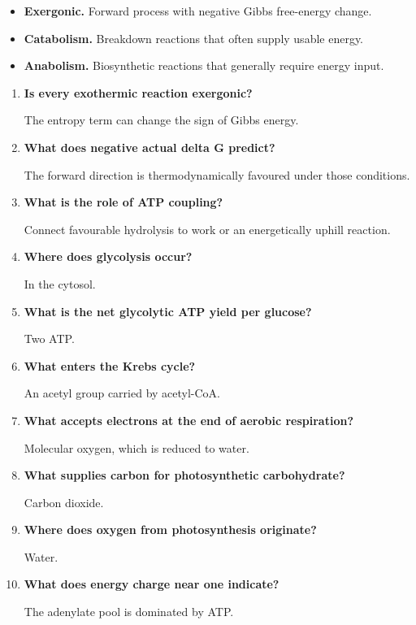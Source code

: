 \documentclass[12pt,a4paper]{article}
\newcommand{\Q}[1]{\textbf{#1}\par\noindent\ignorespaces}
\begin{document}
\begin{tcolorbox}[defbox, title={One-Line Definitions}]
\begin{itemize}[leftmargin=*, itemsep=3pt, topsep=4pt]
  \item \textbf{Exergonic.} Forward process with negative Gibbs free-energy change.
  \item \textbf{Catabolism.} Breakdown reactions that often supply usable energy.
  \item \textbf{Anabolism.} Biosynthetic reactions that generally require energy input.
\end{itemize}
\end{tcolorbox}

\begin{tcolorbox}[exambox, title={Frequently Asked / Viva Questions}]
\begin{enumerate}[topsep=0pt, label=\textbf{Q\arabic*.}, itemsep=5pt, leftmargin=*]
  \item \Q{Is every exothermic reaction exergonic?}
    The entropy term can change the sign of Gibbs energy.
  \item \Q{What does negative actual delta G predict?}
    The forward direction is thermodynamically favoured under those conditions.
  \item \Q{What is the role of ATP coupling?}
    Connect favourable hydrolysis to work or an energetically uphill reaction.
  \item \Q{Where does glycolysis occur?}
    In the cytosol.
  \item \Q{What is the net glycolytic ATP yield per glucose?}
    Two ATP.
  \item \Q{What enters the Krebs cycle?}
    An acetyl group carried by acetyl-CoA.
  \item \Q{What accepts electrons at the end of aerobic respiration?}
    Molecular oxygen, which is reduced to water.
  \item \Q{What supplies carbon for photosynthetic carbohydrate?}
    Carbon dioxide.
  \item \Q{Where does oxygen from photosynthesis originate?}
    Water.
  \item \Q{What does energy charge near one indicate?}
    The adenylate pool is dominated by ATP.
\end{enumerate}
\end{tcolorbox}
\end{document}
